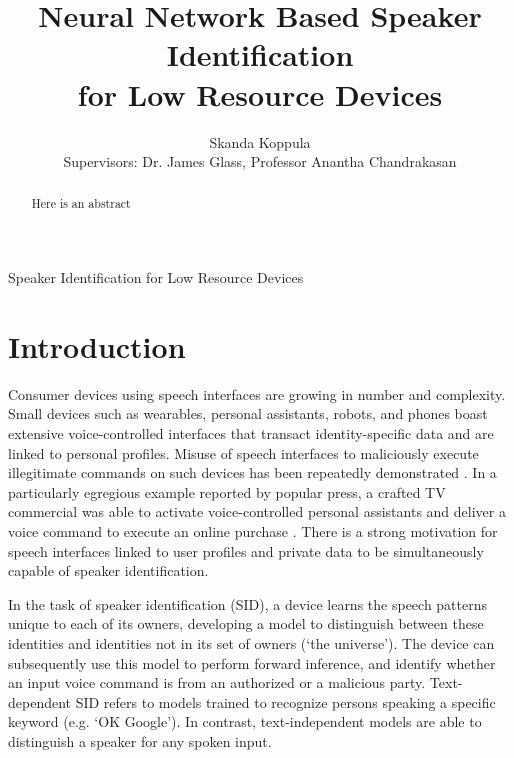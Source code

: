 \documentclass[journal,12pt,onecolumn,draftclsnofoot,]{sty/IEEEtran}
\begin{document}
\title{Neural Network Based Speaker Identification \\ for Low Resource Devices}

\author{Skanda Koppula \\
        Supervisors: Dr. James Glass, Professor Anantha Chandrakasan}%

%
{Speaker Identification for Low Resource Devices}

\maketitle

\begin{abstract}
Here is an abstract
\end{abstract}

\newpage

\section{Introduction}
Consumer devices using speech interfaces are growing in number and complexity. Small devices such as wearables, personal assistants, robots, and phones boast extensive voice-controlled interfaces that transact identity-specific data and are linked to personal profiles. Misuse of speech interfaces to maliciously execute illegitimate commands on such devices has been repeatedly demonstrated \cite{price_2016, feldman_2016}. In a particularly egregious example reported by popular press, a crafted TV commercial was able to activate voice-controlled personal assistants and deliver a voice command to execute an online purchase \cite{bbc_news_2017}. There is a strong motivation for speech interfaces linked to user profiles and private data to be simultaneously capable of speaker identification.

In the task of speaker identification (SID), a device learns the speech patterns unique to each of its owners, developing a model to distinguish between these identities and identities not in its set of owners (`the universe’). The device can subsequently use this model to perform forward inference, and identify whether an input voice command is from an authorized or a malicious party. Text-dependent SID refers to models trained to recognize persons speaking a specific keyword (e.g. `OK Google’). In contrast, text-independent models are able to distinguish a speaker for any spoken input.
\end{document}
